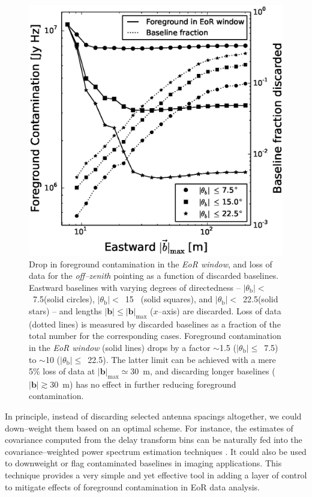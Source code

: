 \documentclass[preprint2,iop,numberedappendix]{emulateapj}
\begin{document}
\begin{figure}[htb]
\centering
\includegraphics[width=\linewidth]{f13.eps}
\caption{Drop in foreground contamination in the {\it EoR window}, and loss of data for the {\it off--zenith} pointing as a function of discarded baselines. Eastward baselines with varying degrees of directedness -- $|\theta_\textrm{b}|<$~7.5\arcdeg (solid circles), $|\theta_\textrm{b}|<$~15\arcdeg~ (solid squares), and $|\theta_\textrm{b}|<$~22.5\arcdeg (solid stars) -- and lengths $|\boldsymbol{b}| \le |\boldsymbol{b}|_\textrm{max}$ ($x$--axis) are discarded. Loss of data (dotted lines) is measured by discarded baselines as a fraction of the total number for the corresponding cases. Foreground contamination in the {\it EoR window} (solid lines) drops by a factor $\sim$1.5 ($|\theta_\textrm{b}|\le$~7.5\arcdeg) to $\sim$10 ($|\theta_\textrm{b}|\le$~22.5\arcdeg). The latter limit can be achieved with a mere 5\% loss of data at $|\boldsymbol{b}|_\textrm{max}\simeq30$~m, and discarding longer baselines ($|\boldsymbol{b}|\gtrsim 30$~m) has no effect in further reducing foreground contamination. \label{fig:screening}}
\end{figure}

In principle, instead of discarding selected antenna spacings altogether, we could down--weight them based on an optimal scheme. For instance, the estimates of covariance computed from the delay transform bins can be naturally fed into the covariance--weighted power spectrum estimation techniques \citep{liu14a,liu14b}. It could also be used to downweight or flag contaminated baselines in imaging applications. This technique provides a very simple and yet effective tool in adding a layer of control to mitigate effects of foreground contamination in EoR data analysis. 
\end{document}
